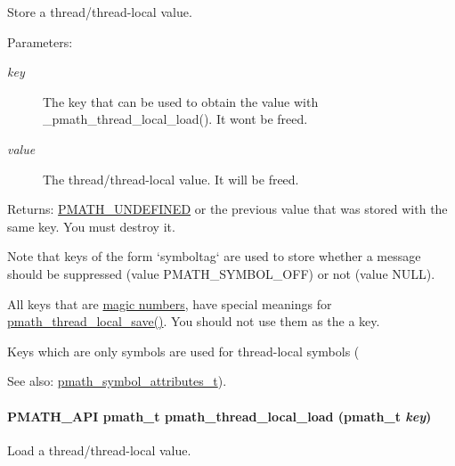 Store a thread/thread-local value. 

\begin{Desc}
\item[Parameters:]
\begin{description}
\item[{\em key}]The key that can be used to obtain the value with \_\-pmath\_\-thread\_\-local\_\-load(). It wont be freed. \item[{\em value}]The thread/thread-local value. It will be freed. \end{description}
\end{Desc}
\begin{Desc}
\item[Returns:]\hyperlink{group__objects_ge2646df76dcb0113715322b13a1f36f0}{PMATH\_\-UNDEFINED} or the previous value that was stored with the same key. You must destroy it.\end{Desc}
Note that keys of the form `symboltag` are used to store whether a message should be suppressed (value PMATH\_\-SYMBOL\_\-OFF) or not (value NULL).

All keys that are \hyperlink{group__objects_ge2646df76dcb0113715322b13a1f36f0}{magic numbers}, have special meanings for \hyperlink{group__threads_ga545e19cccf64ee4848a5506fa20cf21}{pmath\_\-thread\_\-local\_\-save()}. You should not use them as the a key.

Keys which are only symbols are used for thread-local symbols (\begin{Desc}
\item[See also:]\hyperlink{group__symbols_g5d508ec0d32d617b6c642de54907ee17}{pmath\_\-symbol\_\-attributes\_\-t}). \end{Desc}
\hypertarget{group__threads_g64fe008ee1e3a4841eb98ca13e212537}{
\paragraph[{pmath\_\-thread\_\-local\_\-load}]{\setlength{\rightskip}{0pt plus 5cm}PMATH\_\-API {\bf pmath\_\-t} pmath\_\-thread\_\-local\_\-load ({\bf pmath\_\-t} {\em key})}\hfill}
\label{group__threads_g64fe008ee1e3a4841eb98ca13e212537}


Load a thread/thread-local value. 

